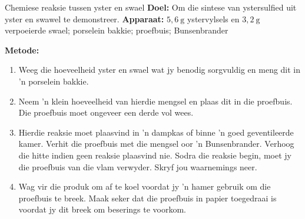             \begin{g_experiment}{Chemiese reaksie tussen yster en swael}
            \nopagebreak
            \label{m38709*id63437}\noindent{}\textbf{Doel:}
          \newline
Om die sintese van ystersulfied uit yster en swawel te demonstreer.
        \label{m38709*id63447}\noindent{}\textbf{Apparaat:}
          \newline
$5,6~\text{g}$ ystervylsels en $3,2~\text{g}$ verpoeierde swael; porselein bakkie; proefbuis; Bunsenbrander\par 
        \label{m38709*id63457}
    \begin{center}
    \end{center}
        \par 
        \label{m38709*id63467}\noindent{}\textbf{Metode:}
          \newline
        \label{m38709*id63473}\begin{enumerate}[noitemsep, label=\textbf{\arabic*}. ] 
            \label{m38709*uid20}\item Weeg die hoeveelheid yster en swael wat jy benodig sorgvuldig en meng dit in 'n porselein bakkie.
\label{m38709*uid21}\item Neem 'n klein hoeveelheid van hierdie mengsel en plaas dit in die proefbuis. Die proefbuis moet ongeveer een derde vol wees.
\label{m38709*uid22}\item Hierdie reaksie moet plaasvind in 'n dampkas of binne 'n goed geventileerde kamer. Verhit die proefbuis met die mengsel oor  'n Bunsenbrander. Verhoog die hitte indien geen reaksie plaasvind nie. Sodra die reaksie begin, moet jy die proefbuis van die vlam verwyder. Skryf jou waarnemings neer.
\label{m38709*uid23}\item Wag vir die produk om af te koel voordat jy  'n hamer gebruik om die proefbuis te breek. Maak seker dat die proefbuis in papier toegedraai is voordat jy dit breek om beserings te voorkom.

\end{enumerate}
\end{g_experiment}
